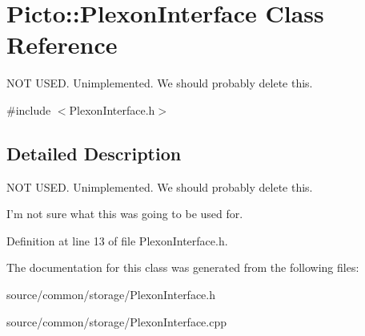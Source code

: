 \hypertarget{class_picto_1_1_plexon_interface}{\section{Picto\-:\-:Plexon\-Interface Class Reference}
\label{class_picto_1_1_plexon_interface}
}


N\-O\-T U\-S\-E\-D. Unimplemented. We should probably delete this.  




{\ttfamily \#include $<$Plexon\-Interface.\-h$>$}



\subsection{Detailed Description}
N\-O\-T U\-S\-E\-D. Unimplemented. We should probably delete this. 

I'm not sure what this was going to be used for. 

Definition at line 13 of file Plexon\-Interface.\-h.



The documentation for this class was generated from the following files\-:\begin{DoxyCompactItemize}
\item 
source/common/storage/Plexon\-Interface.\-h\item 
source/common/storage/Plexon\-Interface.\-cpp\end{DoxyCompactItemize}
